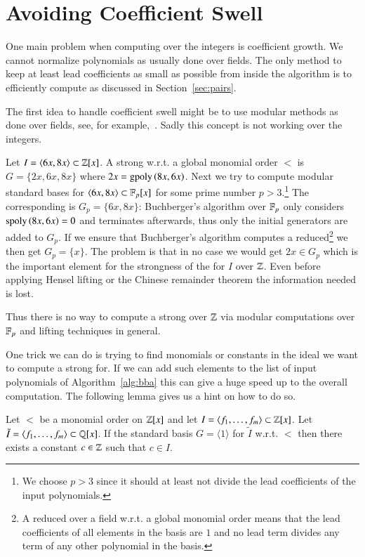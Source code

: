\section{Avoiding Coefficient Swell}
\label{sec:coefficients}
One main problem when computing over the integers is coefficient growth. We
cannot normalize polynomials as usually done over fields. The only method to
keep at least lead coefficients as small as possible from inside the algorithm
is to efficiently compute \gpts as discussed in Section~\ref{sec:pairs}.

The first idea to handle coefficient swell might be to use modular methods as
done over fields, see, for example,~\cite{arnoldModular2003}. Sadly this concept
is not working over the integers.

\begin{example}
Let $I = \langle 6x, 8x \rangle \subset \mathbb{Z}[x]$. A strong \stb w.r.t. a global
monomial order $<$ is $G = \{2x,6x,8x\}$ where $2x = \mathrm{gpoly}\left({8x},{6x}\right)$. Next we try to
compute modular standard bases for $\langle 6x, 8x \rangle \subset \mathbb{F}_p[x]$
for some prime number $p > 3$.\footnote{We choose $p>3$ since it should at least
not divide the lead coefficients of the input polynomials.} The corresponding
\stb is $G_p = \{6x,8x\}$: Buchberger's algorithm over $\mathbb{F}_p$ only considers
$\mathrm{spoly}\left({8x},{6x}\right) = 0$ and terminates afterwards, thus only the initial generators
are added to $G_p$. If
we ensure that Buchberger's algorithm computes a reduced\footnote{A
reduced \stb over a field w.r.t. a global monomial order means that the lead
coefficients of all elements in the basis are $1$ and no lead term divides
any term of any other polynomial in the basis.} \stb we then get $G_p =
\{x\}$. The problem is that in no case we would get $2x \in G_p$ which is
the important element for the strongness of the \stb for $I$ over $\mathbb{Z}$. Even
before applying Hensel lifting or the Chinese remainder theorem the information
needed is lost.

Thus there is no way to compute a strong \stb over $\mathbb{Z}$ via modular computations
over $\mathbb{F}_p$ and lifting techniques in general.
\end{example}

One trick we can do is trying to find monomials or constants in the ideal we
want to compute a strong \stb for. If we can add such elements to the list of
input polynomials of Algorithm~\ref{alg:bba} this can give a huge speed up to
the overall computation. The following lemma gives us a hint on how to do so.

\begin{lemma}
Let $<$ be a monomial order on $\mathbb{Z}[x]$ and let
$I=\langle f_1,\ldots, f_m\rangle \subset \mathbb{Z}[x]$. Let $\tilde I = \langle
f_1,\ldots, f_m\rangle \subset \mathbb{Q}[x]$. If the standard basis $G = \langle 1
\rangle $ for $\tilde I$ w.r.t. $<$ then there exists a constant $c \in \mathbb{Z}$
such that $c \in I$.
\label{lem:syz-coeff}
\end{lemma}

